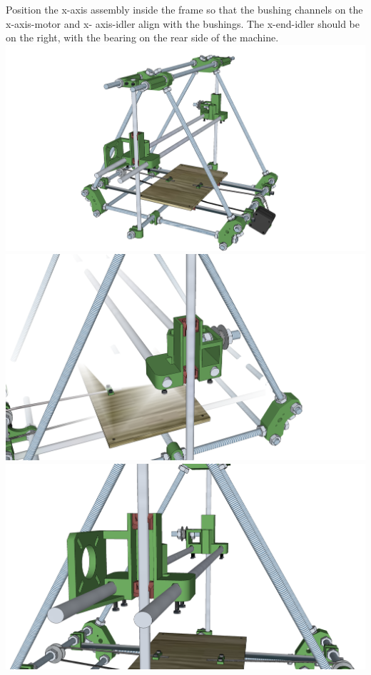 \documentclass[twoside,openany,a4paper,titlepage]{memoir}
\begin{document}
	\section{}
	Position the x-axis assembly inside the frame so that the bushing channels on the x-axis-motor and x-
	axis-idler align with the bushings. The x-end-idler should be on the right, with the bearing on the rear
	side of the machine.\\
	\includegraphics[width=1\linewidth]{graphics/ch8_10_1.png}
	\includegraphics[width=1\linewidth]{graphics/ch8_10_2.png}
	\includegraphics[width=1\linewidth]{graphics/ch8_10_3.png}
	
\end{document}
